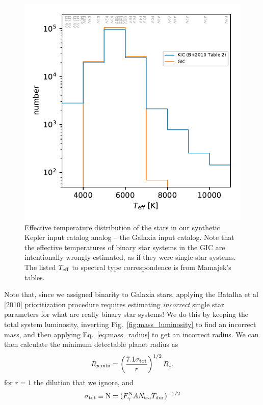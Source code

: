 \documentclass{emulateapj}
\begin{document}
\begin{figure}[!t]
	\begin{center}
		\includegraphics[scale=0.8]{figures/KIC_vs_GIC_teff_distribn.pdf}
	\end{center}
	\caption{Effective temperature distribution of the stars in our synthetic 
		Kepler input catalog analog -- the Galaxia input catalog.
		Note that the effective temperatures of binary star systems in the GIC 
		are 
		intentionally wrongly estimated, as if they were single star systems.
		The listed $T_{\rm eff}$ to spectral type correspondence is from 
		Mamajek's tables.
	}
	\label{fig:KIC_vs_GIC_teff_distribn}
\end{figure}


Note that, since we assigned binarity to Galaxia stars, applying the Batalha et 
al [2010] prioritization procedure requires estimating \textit{incorrect} 
single star parameters for what are really binary star systems!
We do this by keeping the total system luminosity, inverting 
Fig.~\ref{fig:mass_luminosity} to find an incorrect mass, and then applying 
Eq.~\ref{eq:mass_radius} to get an incorrect radius.
We can then calculate the minimum detectable planet radius as
\begin{equation}
R_{p,{\rm min}} = \left(\frac{7.1 \sigma_{\rm tot}}{r}\right)^{1/2} R_\star,
\label{eq:min_det_radius}
\end{equation}
for $r=1$ the dilution that we ignore, and
\begin{equation}
\sigma_{\rm tot} \equiv {\rm N} = (F_\gamma^{\rm N} A N_{\rm tra} T_{\rm 
dur})^{-1/2}
\end{equation}
\end{document}
